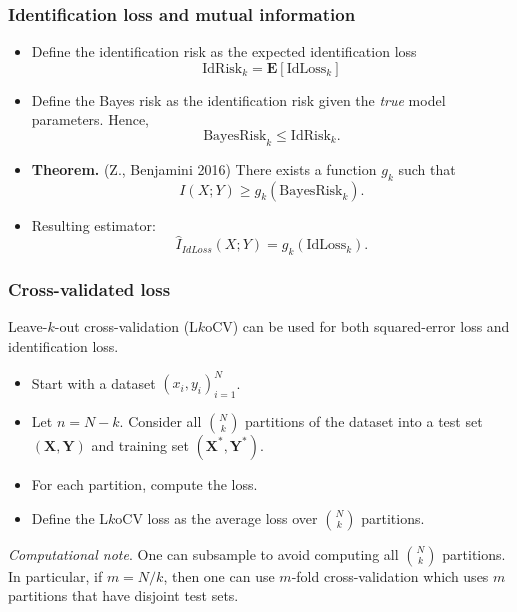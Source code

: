\documentclass{beamer}
\newcommand{\E}{\textbf{E}}
\newcommand{\bX}{\boldsymbol{X}}
\newcommand{\bY}{\boldsymbol{Y}}
\begin{document}
\begin{frame}
\frametitle{Identification loss and mutual information}
\begin{itemize}
\item Define the identification risk as the expected identification loss
\[
\text{IdRisk}_k = \E[\text{IdLoss}_k]
\]
\item Define the Bayes risk as the identification risk given the \emph{true} model parameters.
Hence,
\[
\text{BayesRisk}_k \leq \text{IdRisk}_k.
\]
\item \textbf{Theorem.} (Z., Benjamini 2016) There exists a function $g_k$ such that
\[I(X; Y) \geq g_k(\text{BayesRisk}_k).\]
\item Resulting estimator:
\[
\hat{I}_{IdLoss}(X; Y) = g_k(\text{IdLoss}_k).
\]
\end{itemize}
\end{frame}


\begin{frame}
\frametitle{Cross-validated loss}
Leave-$k$-out cross-validation (L$k$oCV) can be used for both squared-error loss and identification loss.
\begin{itemize}
\item Start with a dataset $(x_i,y_i)_{i=1}^N$.
\item Let $n = N-k$.  Consider all ${N}\choose{k}$ partitions of the dataset into a test set $(\bX, \bY)$ and training set $(\bX^*, \bY^*)$.
\item For each partition, compute the loss.
\item Define the L$k$oCV loss as the average loss over ${N}\choose{k}$ partitions.
\end{itemize}
\emph{Computational note}.  One can subsample to avoid computing all
${N}\choose{k}$ partitions.  In particular, if $m = N/k$, then one can
use $m$-fold cross-validation which uses $m$ partitions that have
disjoint test sets.
\end{frame}
\end{document}
